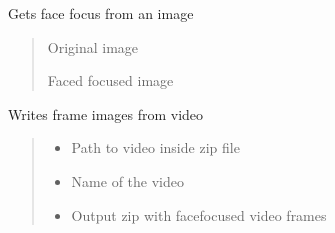 \documentclass[letterpaper,10pt,english]{sphinxmanual}
\begin{document}
\begin{fulllineitems}
\label{\detokenize{extract_movie_frames:extract_movie_frames.get_face_from_image}}
\pysigstartsignatures
{}
\pysigstopsignatures
\sphinxAtStartPar
Gets face focus from an image
\begin{quote}\begin{description}
\sphinxAtStartPar
{} \textendash{} Original image

\sphinxAtStartPar
Faced focused image

\end{description}\end{quote}

\end{fulllineitems}


\begin{fulllineitems}
\label{\detokenize{extract_movie_frames:extract_movie_frames.write_movie_frames}}
\pysigstartsignatures
{}
\pysigstopsignatures
\sphinxAtStartPar
Writes frame images from video
\begin{quote}\begin{description}
\begin{itemize}
\item {} 
\sphinxAtStartPar
{} \textendash{} Path to video inside zip file

\item {} 
\sphinxAtStartPar
{} \textendash{} Name of the video

\item {} 
\sphinxAtStartPar
{} \textendash{} Output zip with face\sphinxhyphen{}focused video frames

\end{itemize}

\end{description}\end{quote}

\end{fulllineitems}
\end{document}
